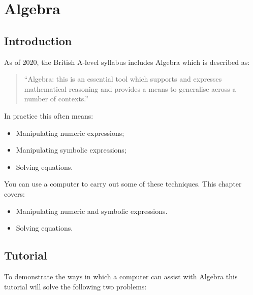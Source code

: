 \chapter{Algebra}
\label{chp:algebra}

\section{Introduction}

As of 2020, the British A-level syllabus includes Algebra which
is described 
as:

\begin{quote}
``Algebra: this is an essential tool which supports and expresses mathematical
reasoning and provides a means to generalise across a number of contexts.''
\end{quote}

In practice this often means:
\begin{itemize}
\item Manipulating numeric expressions;
\item Manipulating symbolic expressions;
\item Solving equations.
\end{itemize}


You can use a computer to carry out some of these techniques.
This chapter covers:

\begin{itemize}
\item Manipulating numeric and symbolic expressions.
\item Solving equations.
\end{itemize}

\section{Tutorial}

To demonstrate the ways in which a computer can assist with Algebra this
tutorial
will solve the following two problems:

